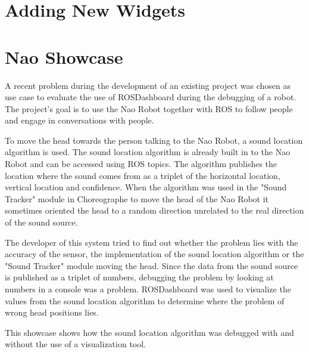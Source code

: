 \section{Adding New Widgets}

\section{Nao Showcase}
A recent problem during the development of an existing project was chosen as use case  to evaluate \q the use of ROSDashboard during the debugging of a robot. The project's goal is to use the Nao Robot  together with ROS to follow people and engage in conversations with people.


To move the head towards the person talking to the Nao Robot, a sound location algorithm is used. The sound location algorithm is already built in to the Nao Robot and can be accessed using ROS topics. The algorithm publishes the location where the sound comes from as a triplet of the horizontal location, vertical location and confidence. When the algorithm was used in the "Sound Tracker" module in Choreographe  to move the head of the Nao Robot it sometimes oriented the head to a random direction unrelated to the real direction of the sound source.

The developer of this system tried to find out whether the problem lies with the accuracy of the sensor, the implementation of the sound location algorithm or the "Sound Tracker" module moving the head. Since the data from the sound source is published as a triplet of numbers, debugging the problem by looking at numbers in a console was a problem. ROSDashboard was used to visualize the values from the sound location algorithm to determine where the problem of wrong head positions lies.

 \cite{Cousins2010}




This showcase \q shows how the sound location algorithm was debugged with and without the use of a visualization tool.

